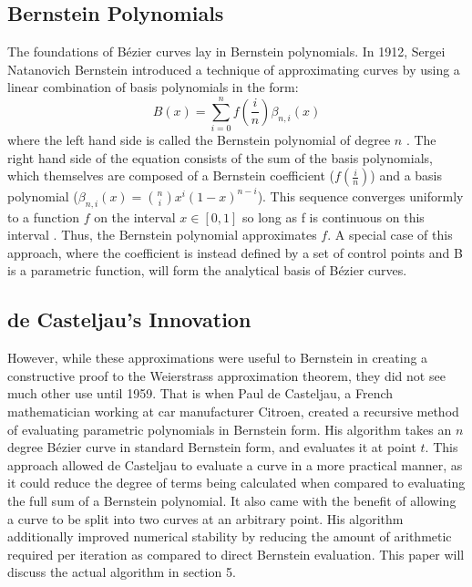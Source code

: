 \documentclass{article}
\begin{document}
\subsection{Bernstein Polynomials}
The foundations of Bézier curves lay in Bernstein polynomials. In 1912, Sergei Natanovich Bernstein introduced a technique of approximating curves by using a linear combination of basis polynomials in the form:$$B(x)=\sum_{i=0}^nf(\frac{i}{n})\beta_{n,i}(x)$$ where the left hand side is called the Bernstein polynomial of degree $n$ \cite{bernstein-polynomials}. The right hand side of the equation consists of the sum of the basis polynomials, which themselves are composed of a Bernstein coefficient ($f(\frac{i}{n})$) and a basis polynomial ($\beta_{n,i}(x)=\binom{n}{i}x^i(1-x)^{n-i}$). This sequence converges uniformly to a function $f$ on the interval $x\in[0,1]$ so long as f is continuous on this interval \cite{bernstein-polynomials}. Thus, the Bernstein polynomial approximates $f$. A special case of this approach, where the coefficient is instead defined by a set of control points and B is a parametric function, will form the analytical basis of Bézier curves.

\subsection{de Casteljau's Innovation}
 However, while these approximations were useful to Bernstein in creating a constructive proof to the Weierstrass approximation theorem, they did not see much other use until 1959. That is when Paul de Casteljau, a French mathematician working at car manufacturer Citroen, created a recursive method of evaluating parametric polynomials in Bernstein form. His algorithm takes an $n$ degree Bézier curve in standard Bernstein form, and evaluates it at point $t$. This approach allowed de Casteljau to evaluate a curve in a more practical manner, as it could reduce the degree of terms being calculated when compared to evaluating the full sum of a Bernstein polynomial. It also came with the benefit of allowing a curve to be split into two curves at an arbitrary point. His algorithm additionally improved numerical stability by reducing the amount of arithmetic required per iteration as compared to direct Bernstein evaluation.\cite{shene11} This paper will discuss the actual algorithm in section 5.
\end{document}
